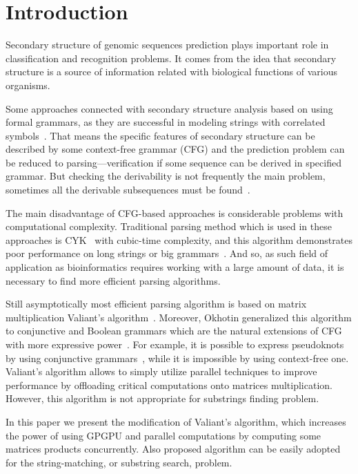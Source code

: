 \section{\bf Introduction}

Secondary structure of genomic sequences prediction plays important role in classification and recognition problems. It comes from the idea that secondary structure is a source of information  related with biological functions of various organisms.

Some approaches connected with secondary structure analysis based on using formal grammars, as they are successful in modeling strings with correlated symbols~\cite{knudsen1999rna, dowell2004evaluation}.
That means the specific features of secondary structure can be described by some context-free grammar (CFG) and the prediction problem can be reduced to parsing---verification if some sequence can be derived in specified grammar.
But checking the derivability is not frequently the main problem, sometimes all the derivable subsequences must be found~\cite{durbin1996biological}.

The main disadvantage of CFG-based approaches is considerable problems with computational complexity.
Traditional parsing method which is used in these approaches is CYK~\cite{kasami1966efficient, Younger:1966:CLP:1441427.1442019} with cubic-time complexity, and this algorithm demonstrates poor performance on long strings or big grammars~\cite{liu2005parallel}.
And so, as such field of application as bioinformatics requires working with a large amount of data, it is necessary to find more efficient parsing algorithms.

Still asymptotically most efficient parsing algorithm is based on matrix multiplication Valiant's algorithm~\cite{Valiant:1975:GCR:1739932.1740048}.
Moreover, Okhotin generalized this algorithm to conjunctive and Boolean grammars which are the natural extensions of CFG with more expressive power~\cite{Okhotin:2014:PMM:2565359.2565379}.
For example, it is possible to express pseudoknots by using conjunctive grammars~\cite{zier2013rna}, while it is impossible by using context-free one.
Valiant’s algorithm allows to simply utilize parallel techniques to improve performance by offloading critical computations onto matrices multiplication.
However, this algorithm is not appropriate for substrings finding problem.

In this paper we present the modification of Valiant's algorithm, which increases the power of using GPGPU and parallel computations by computing some matrices products concurrently.
Also proposed algorithm can be easily adopted for the string-matching, or substring search, problem.
